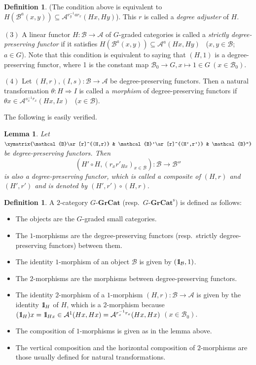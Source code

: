\documentclass{surv-l}
\numberwithin{equation}{chapter}
\numberwithin{figure}{chapter}
\theoremstyle{plain}
\newtheorem{lem}[thm]{Lemma}
\theoremstyle{definition}
\newtheorem{dfn}[thm]{Definition}
\theoremstyle{remark}
\newcommand{\id}{1\kern-.25em{\text{{\rm l}}}}
\newcommand{\GGrCat}{G\text{-}\mathbf{GrCat}}
\newcommand{\GGrCats}{G\text{-}\mathbf{GrCat}^{\mathrm{s}}}
\begin{document}
\begin{dfn}
(The condition above is equivalent to
$H(\mathcal{B}^{a}(x,y))\subseteq\mathcal{A}{}^{r_{y}^{-1} ar_{x}}(Hx,Hy)$).
This $r$ is called a \emph{degree adjuster} of $H$.

$(3)$ A linear functor $H\colon\mathcal{B}\to\mathcal{A}$ of $G$-graded categories
is called a \emph{strictly degree-preserving functor} if it satisfies
$H(\mathcal{B}^{a}(x,y))\subseteq\mathcal{A}^{a}(Hx,Hy)$
\ ($x,y\in\mathcal{B}$; $a\in G$).
Note that this condition is equivalent to saying that $(H, 1)$ is a degree-preserving functor,
where 1 is the constant map $\mathcal{B}_0\to G, x \mapsto 1 \in G \ (x \in \mathcal{B}_0)$.

$(4)$ Let $(H,r),(I,s)\colon\mathcal{B}\to\mathcal{A}$ be degree-preserving functors.
Then a natural transformation $\theta\colon H\Rightarrow I$ is called a \emph{morphism}
of degree-preserving functors if
$\theta x\in\mathcal{A}{}^{s_{x}^{-1}r_{x}}(Hx,Ix)$
\ ($x\in\mathcal{B}$).
\end{dfn}

The following is easily verified.

\begin{lem}
Let $\xymatrix{\mathcal{B}\ar[r]^{(H,r)} & \mathcal{B}'\ar[r]^{(H',r')} & \mathcal{B}''}$
be degree-preserving functors.  Then
\begin{equation*}
(H' \circ H,(r_{x}r'_{Hx})_{x\in\mathcal{B}})\colon\mathcal{B}\to\mathcal{B}''
\end{equation*}
is also a degree-preserving functor, which is called a \emph{composite}
of $(H,r)$ and $(H',r')$ and is denoted by $(H',r')\circ (H,r)$.
\pagebreak \end{lem}

\begin{dfn}\label{dfn:G-GrCat}
A $2$-category $\GGrCat$ (resp.\ $\GGrCats$) is defined as follows:
\begin{itemize}
\item The objects are the $G$-graded small categories.
\item The $1$-morphisms are the degree-preserving functors
(resp.\ strictly degree-preserving functors)  between them.
\item
The identity $1$-morphism of an object $\mathcal{B}$ is given by $(\id_\mathcal{B}, 1)$.
\item The $2$-morphisms are the morphisms between degree-preserving functors.
\item
The identity $2$-morphism of a $1$-morphism $(H, r)\colon \mathcal{B} \to \mathcal{A}$ is given by the identity $\id_H$
of $H$, which is a $2$-morphism because
$(\id_{H})x =\id_{Hx} \in \mathcal{A}^1(Hx, Hx) = \mathcal{A}^{r_x^{-1} r_x}(Hx, Hx)$
 $(x \in \mathcal{B}_0)$.
\item The composition of $1$-morphisms is given as in the lemma above.
\item The vertical composition and the horizontal composition of $2$-morphisms
are those usually defined for natural transformations.
\end{itemize}
\end{dfn}
\end{document}
